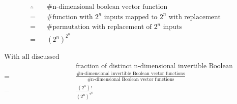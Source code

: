 \documentclass[11pt]{article}
\begin{document}
\begin{enumerate}[label=\alph*.]
    \begin{align*}
        \therefore\ \ \ \ \ & \# \text{n-dimensional boolean vector function} \\
        =\ & \# \text{function with } 2^n \text{ inputs mapped to } 2^n \text{ with replacement}\\
        =\ & \# \text{permutation with replacement of } 2^n \text{ inputs} \\
        =\ & (2^n)^{2^n}
    \end{align*}
    
    \begin{align*}
        \text{With all discussed above,} & \\
        & \text{fraction of distinct n-dimensional invertible Boolean vector functions} \\
        =\ & \frac{\# \text{n-dimensional invertible Boolean vector functions}}{\# \text{n-dimensional Boolean vector functions}} \\
        =\ & \frac{(2^n)!}{(2^n)^{2^n}}
    \end{align*}
    
    
\end{enumerate}
\end{document}
